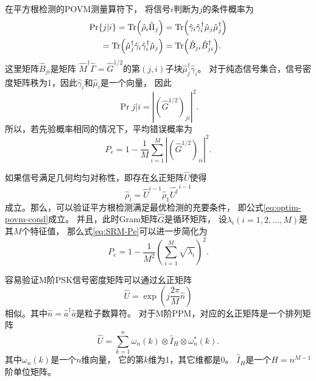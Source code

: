 在平方根检测的POVM测量算符下，
将信号$i$判断为$j$的条件概率为
\begin{equation}
\begin{split}
\Pr{j|i} = \Tr(\hat{\rho}_i \hat{\Pi}_j) & = \Tr(\hat{\gamma}_i \hat{\gamma}_i^\dagger \hat{\mu}_j \hat{\mu}_j^\dagger) \\
     =\Tr(\hat{\mu}_j^\dagger\hat{\gamma}_i \hat{\gamma}_i^\dagger \hat{\mu}_j )     & = \Tr(\hat{B}_{ji} \hat{B}_{ji}^\dagger).
\end{split}
\end{equation}
这里矩阵$\hat{B}_{ji}$是矩阵 $\hat{M}^\dagger \hat{\Gamma} = \hat{G}^{1/2}$的第$(j,i)$子块$\hat{\mu}_j^\dagger\hat{\gamma}_i$。
对于纯态信号集合，信号密度矩阵秩为1，因此$\hat{\gamma}_i$和$\hat{\mu}_i$是一个向量，
因此
\begin{equation}
\Pr{j|i} = |(\hat{G}^{1/2})_{ji}|^2.
\end{equation}
所以，若先验概率相同的情况下，平均错误概率为
\begin{equation}
P_e = 1 - \frac{1}{M}\sum_{i=1}^M |(\hat{G}^{1/2})_{ii}|^2.
\label{eq:SRM-Pe}
\end{equation}


如果信号满足几何均匀对称性，即存在幺正矩阵$\hat{U}$使得
\begin{equation}
\hat{\rho}_i = \hat{U}^{i-1} \hat{\rho}_1 \hat{U^\dagger} ^ {i-1}
\end{equation}
成立。那么，可以验证平方根检测满足最优检测的充要条件\cite{eldar2001quantum}，
即公式\ref{eq:optim-povm-cond}成立。
并且，此时Gram矩阵$\hat{G}$是循环矩阵，
设$\lambda_i(i=1,2,...,M)$是其$M$个特征值，
那么式\ref{eq:SRM-Pe}可以进一步简化为\cite{kato1999quantum}
\begin{equation}
P_e = 1 - \frac{1}{M^2} (\sum_{i=1}^M \sqrt{\lambda_i})^2.
\label{eq:SRM-Pe-GUS}
\end{equation}

容易验证M阶PSK信号密度矩阵可以通过幺正矩阵\cite{kato1999quantum}
\begin{equation}
\hat{U} = \exp(j\frac{2\pi}{M} \hat{n})
\end{equation}
相似。其中$\hat{n}=\hat{a}^\dagger \hat{a}$是粒子数算符。
对于M阶PPM，对应的幺正矩阵是一个排列矩阵\cite{cariolaro2010theory}
\begin{equation}
\hat{U} = \sum_{k=1}^n \omega_n(k) \otimes \hat{I}_H \otimes \omega_n^*(k).
\end{equation}
其中$\omega_n(k)$是一个$n$维向量，
它的第$k$维为1，其它维都是0。
$\hat{I}_H$是一个$H=n^{M-1}$阶单位矩阵。

